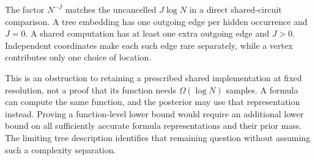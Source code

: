 The factor $N^{-J}$ matches the uncancelled $J\log N$ in a direct shared-circuit comparison. A tree embedding has one outgoing edge per hidden occurrence and $J=0$. A shared computation has at least one extra outgoing edge and $J>0$. Independent coordinates make each such edge rare separately, while a vertex contributes only one choice of location.

This is an obstruction to retaining a prescribed shared implementation at fixed resolution, not a proof that its function needs $\Omega(\log N)$ samples. A formula can compute the same function, and the posterior may use that representation instead. Proving a function-level lower bound would require an additional lower bound on all sufficiently accurate formula representations and their prior mass. The limiting tree description identifies that remaining question without assuming such a complexity separation.
